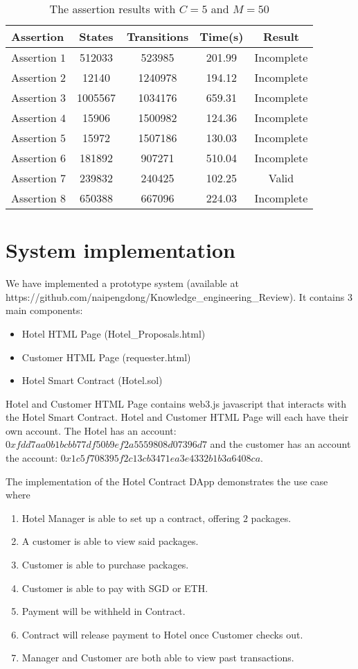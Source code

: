\documentclass{KERauth}
\begin{document}
\begin{table}[h]
    \centering
    \begin{tabular}{l|c|c|c|c}
    \hline
      Assertion &States &Transitions& Time(s) &Result\\
      \hline
Assertion $1$ & 512033 & 523985 & 201.99 & Incomplete\\
Assertion $2$ & 12140 & 1240978 & 194.12 & Incomplete\\
Assertion $3$ & 1005567 & 1034176 & 659.31 & Incomplete\\
Assertion $4$ & 15906 & 1500982 & 124.36 & Incomplete\\
Assertion $5$ & 15972  & 1507186 & 130.03 & Incomplete\\
Assertion $6$ & 181892  & 907271 & 510.04 & Incomplete\\
Assertion $7$ & 239832 & 240425 & 102.25 & Valid\\
Assertion $8$ & 650388 & 667096 & 224.03 & Incomplete\\
\hline
    \end{tabular}
    \caption{The assertion results with $C = 5$ and $M = 50$}
    \label{tab:verif_2}
\end{table}


\section{System implementation}

We have implemented a prototype system (available at https://github.com/naipengdong/Knowledge\_engineering\_Review).
It contains $3$ main components:
\begin{itemize}
    \item Hotel HTML Page (Hotel\_Proposals.html)
    \item 	Customer HTML Page (requester.html)
    \item Hotel Smart Contract (Hotel.sol)
\end{itemize}
Hotel and Customer HTML Page contains web3.js javascript that interacts with the Hotel Smart Contract. Hotel and Customer HTML Page will each have their own account. The Hotel has an account: $0xfdd7aa0b1bcbb77df50b9ef2a5559808d07396d7$ and the customer has an account the account: $0x1c5f708395f2c13cb3471ea3e4332b1b3a6408ca$.

The implementation of the Hotel Contract DApp demonstrates the use case where
\begin{enumerate}
\item Hotel Manager is able to set up a contract, offering $2$ packages.
\item A customer is able to view said packages.
\item	Customer is able to purchase packages.
\item	Customer is able to pay with SGD or ETH.
\item	Payment will be withheld in Contract.
\item	Contract will release payment to Hotel once Customer checks out.
\item	Manager and Customer are both able to view past transactions.
\end{enumerate}
\end{document}
